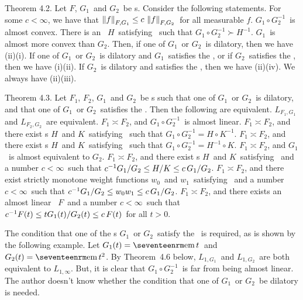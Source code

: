 \proclaim Theorem 4.2. Let $F$, $G_1$\ and $G_2$\ be \phifunction s. Consider
the following statements.
\itemi For some $c<\infty$, we have that 
$\left\| f \right\|_{F,G_1} \le c\, \left\| f \right\|_{F,G_2}$\ for all measurable $f$.
\itemii $G_1\circ G_2^{-1}$\ is almost convex.
\itemiii There is an \Nfunction\ $H$\ satisfying \conditionJ\ such that $G_1\circ
G_2^{-1} \succ H^{-1}$. 
\itemiv $G_1$\ is almost more convex than $G_2$.
\moreproclaim\noindent
Then, if one of
$G_1$\ or $G_2$\ is dilatory, then we have (ii)\implies(i). If one of 
$G_1$\ or $G_2$\ is dilatory and $G_1$\ satisfies the \Deltacond, or if
$G_2$\ satisfies the \Deltacond, then we have (i)\implies(ii). If $G_2$\ is
dilatory and satisfies the \Deltacond, then we have (ii)\iff(iv). 
We always have (ii)\iff(iii).

\proclaim Theorem 4.3. Let $F_1$, $F_2$, $G_1$\ and $G_2$\ be \phifunction s
such that one of $G_1$\ or $G_2$\ is dilatory, and that one of $G_1$\ or $G_2$\
satisfies the \Deltacond. Then the following are equivalent.
\itemi $L_{F_1,G_1}$ and $L_{F_2,G_2}$\ are equivalent.
\itemii $F_1 \asymp F_2$, and $G_1\circ G_2^{-1}$\ is almost linear.
\itemiii $F_1 \asymp F_2$, and there exist \Nfunction s $H$\ and $K$\
satisfying \conditionJ\ such that $G_1\circ G_2^{-1} = H\circ K^{-1}$.
\itemiv $F_1 \asymp F_2$, and there exist \Nfunction s $H$\ and $K$\
satisfying \conditionJ\ such that $G_1\circ G_2^{-1} = H^{-1}\circ K$. 
\itemv $F_1 \asymp F_2$, and $G_1$\ is almost equivalent to $G_2$. 
\itemvi $F_1\asymp F_2$, and there exist \Nfunction s $H$\ and $K$\
satisfying \conditionJ\ and a number $c<\infty$\ such that  $ {c^{-1}} G_1/G_2 \le
H/K \le c\, G_1/G_2 $.
\itemvii $F_1 \asymp F_2$, and there exist strictly monotone weight functions
$w_0$\ and $w_1$\ satisfying \conditionL\ and a number $c<\infty$\ such that
${c^{-1}} G_1/G_2 \le w_0 w_1 \le c\, G_1/G_2 $. 
\itemviii $F_1 \asymp F_2$, and there exists an almost linear \phifunction\ $F$\
and a number $c<\infty$\ such that
${c^{-1}} F(t) \le t G_1(t) / G_2(t) \le c\, F(t)$\ for all $t>0$.
\moreproclaim

The condition that one of the \phifunction s $G_1$\ or $G_2$\ satisfy the
\Deltacond\ is required, as is shown by the following example. Let $G_1(t) =
\em t$\ and $G_2(t) = \em t^2$. By Theorem~4.6 below, $L_{1,G_1}$\ and
$L_{1,G_2}$\ are both equivalent to $L_{1,\infty}$. But, it is clear that
$G_1\circ G_2^{-1}$\ is far from being almost linear. The author
doesn't know whether the condition
that one of $G_1$\ or $G_2$\ be dilatory is needed.

